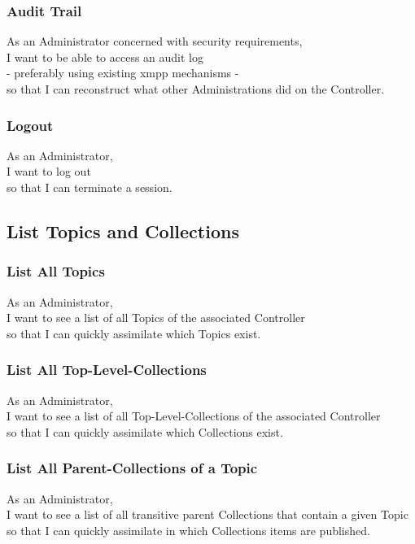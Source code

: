 \subsubsection{Audit Trail}

As an Administrator concerned with security requirements,\\
I want to be able to access an audit log\\
- preferably using existing \gls{xmpp} mechanisms - \\
so that I can reconstruct what other Administrations did on the Controller.

\subsubsection{Logout}

As an Administrator,\\
I want to log out\\
so that I can terminate a session.

\subsection{List Topics and Collections}

\subsubsection{List All Topics}
As an Administrator,\\
I want to see a list of all Topics of the associated Controller\\
so that I can quickly assimilate which Topics exist.

\subsubsection{List All Top-Level-Collections}
As an Administrator,\\
I want to see a list of all Top-Level-Collections of the associated Controller\\
so that I can quickly assimilate which Collections exist.

\subsubsection{List All Parent-Collections of a Topic}
As an Administrator,\\
I want to see a list of all transitive parent Collections that contain a given Topic\\
so that I can quickly assimilate in which Collections items are published.

